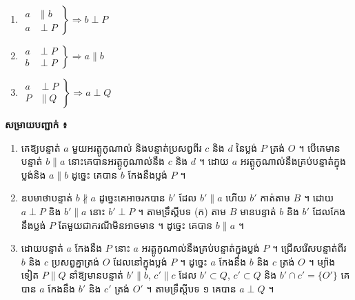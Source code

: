\begin{theorem}[ទ្រឹស្ដីបទទី ២]
\begin{enumerate}[a]
  \item $\left.\begin{aligned} a &\parallel b\\ a &\perp P \end{aligned}\right\} \Rightarrow b \perp P$
  \item $\left.\begin{aligned} a &\perp P\\ b &\perp P \end{aligned}\right\} \Rightarrow a \parallel b$
  \item $\left.\begin{aligned} a &\perp P\\ P &\parallel Q \end{aligned}\right\} \Rightarrow a \perp Q$
\end{enumerate}
\end{theorem}
\textbf{សម្រាយបញ្ជាក់ ៖}
\begin{enumerate}[a]
  \item គេឱ្យបន្ទាត់ $a$ មួយអរត្តូកូណាល់ និងបន្ទាត់ប្រសព្វពីរ $c$ និង $d$ នៃប្លង់ $P$ ត្រង់ $O$ ។ បើគេមានបន្ទាត់ $b \parallel a$ នោះគេបានអរត្តូកូណាល់នឹង $c$ និង $d$ ។ ដោយ $a$ អរត្តូកូណាល់នឹងគ្រប់បន្ទាត់ក្នុងប្លង់និង $a \parallel b$ ដូច្នេះ គេបាន $b$ កែងនឹងប្លង់ $P$ ។
  \item ឧបមាថាបន្ទាត់ $b \nparallel a$ ដូច្នេះគេអាចរកបាន $b'$ ដែល $b' \parallel a$ ហើយ $b'$ កាត់តាម $B$ ។ ដោយ $a \perp P$ និង $b' \parallel a$ នោះ $b' \perp P$ ។ តាមទ្រឹស្ដីបទ (ក) តាម $B$ មានបន្ទាត់ $b$ និង $b'$ ដែលកែងនឹងប្លង់ $P$ តែមួយជាករណីមិនអាចមាន ។ ដូច្នេះ គេបាន $b \parallel a$ ។
  \item ដោយបន្ទាត់ $a$ កែងនឹង $P$ នោះ $a$ អរត្តូកូណាល់នឹងគ្រប់បន្ទាត់ក្នុងប្លង់ $P$ ។ ជ្រើសរើសបន្ទាត់ពីរ $b$ និង $c$ ប្រសព្វគ្នាត្រង់ $O$ ដែលនៅក្នុងប្លង់ $P$ ។ ដូច្នេះ $a$ កែងនឹង $b$ និង $c$ ត្រង់ $O$ ។ ម្យ៉ាងទៀត $P \parallel Q$ នាំឱ្យមានបន្ទាត់ $b' \parallel b$, $c' \parallel c$ ដែល $b' \subset Q$, $c' \subset Q$ និង $b' \cap c' = \{O'\}$ គេបាន $a$ កែងនឹង $b'$ និង $c'$ ត្រង់ $O'$ ។ តាមទ្រឹស្ដីបទ ១ គេបាន $a \perp Q$ ។
\end{enumerate}

